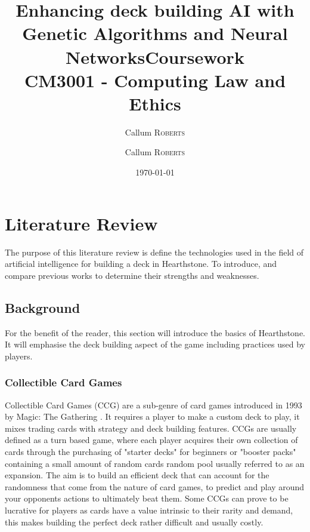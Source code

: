 \documentclass{report}
\title{Enhancing deck building AI with Genetic Algorithms and Neural Networks} %
\author{Callum \textsc{Roberts}} %
\title{Coursework\\ CM3001 - Computing Law and Ethics} %
\author{Callum \textsc{Roberts}} %
\date{\today} %
\begin{document}
\maketitle %



\chapter{Literature Review}
The purpose of this literature review is define the technologies used in the field of artificial intelligence for building a deck in Hearthstone. To introduce, and compare previous works to determine their strengths and weaknesses. 
\section{Background}
	For the benefit of the reader, this section will introduce the basics of Hearthstone. It will emphasise the deck building aspect of the game including practices used by players.  
\subsection{Collectible Card Games}
	Collectible Card Games (CCG) are a sub-genre of card games introduced in 1993 by Magic: The Gathering \cite{CCG}. It requires a player to make a custom deck to play, it mixes trading cards with strategy and deck building features. CCGs are usually defined as a turn based game, where each player acquires their own collection of cards through the purchasing of "starter decks" for beginners or "booster packs" containing a small amount of random cards random pool usually referred to as an expansion. The aim is to build an efficient deck that can account for the randomness that come from the nature of card games, to predict and play around your opponents actions to ultimately beat them. Some CCGs can prove to be lucrative for players as cards have a value intrinsic to their rarity and demand, this makes building the perfect deck rather difficult and usually costly.
\end{document}
